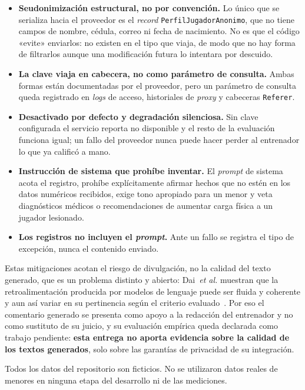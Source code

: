 \documentclass[11pt,a4paper]{article}
\begin{document}
\begin{itemize}[leftmargin=*]
  \item \textbf{Seudonimización estructural, no por convención.} Lo único
    que se serializa hacia el proveedor es el \emph{record}
    \texttt{PerfilJugadorAnonimo}, que no tiene campos de nombre, cédula,
    correo ni fecha de nacimiento. No es que el código «evite» enviarlos:
    no existen en el tipo que viaja, de modo que no hay forma de filtrarlos
    aunque una modificación futura lo intentara por descuido.
  \item \textbf{La clave viaja en cabecera, no como parámetro de consulta.}
    Ambas formas están documentadas por el proveedor, pero un parámetro de
    consulta queda registrado en \emph{logs} de acceso, historiales de
    \emph{proxy} y cabeceras \texttt{Referer}.
  \item \textbf{Desactivado por defecto y degradación silenciosa.} Sin
    clave configurada el servicio reporta no disponible y el resto de la
    evaluación funciona igual; un fallo del proveedor nunca puede hacer
    perder al entrenador lo que ya calificó a mano.
  \item \textbf{Instrucción de sistema que prohíbe inventar.} El
    \emph{prompt} de sistema acota el registro, prohíbe explícitamente
    afirmar hechos que no estén en los datos numéricos recibidos, exige
    tono apropiado para un menor y veta diagnósticos médicos o
    recomendaciones de aumentar carga física a un jugador lesionado.
  \item \textbf{Los registros no incluyen el \emph{prompt}.} Ante un fallo
    se registra el tipo de excepción, nunca el contenido enviado.
\end{itemize}

Estas mitigaciones acotan el riesgo de divulgación, no la calidad del texto
generado, que es un problema distinto y abierto: Dai~\emph{et al.} muestran
que la retroalimentación producida por modelos de lenguaje puede ser fluida
y coherente y aun así variar en su pertinencia según el
criterio evaluado~\cite{dai2024feedback}. Por eso el comentario generado se
presenta como apoyo a la redacción del entrenador y no como sustituto de su
juicio, y su evaluación empírica queda declarada como trabajo pendiente:
\textbf{esta entrega no aporta evidencia sobre la calidad de los textos
generados}, solo sobre las garantías de privacidad de su integración.

Todos los datos del repositorio son ficticios. No se utilizaron datos reales
de menores en ninguna etapa del desarrollo ni de las mediciones.
\end{document}
